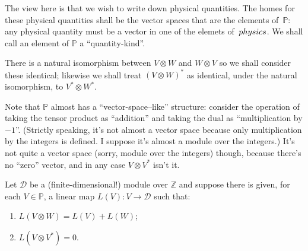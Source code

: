 \documentclass[a4paper, twocolumn, 10pt]{article}
\newcommand{\physics}{\mathbb{P}}
\newcommand{\dimensions}{\mathcal{D}}
\newcommand{\integers}{\mathbb{Z}}
\begin{document}
The view here is that we wish to write down physical quantities. The homes for
these physical quantities shall be the vector spaces that are the elements
of~$\physics$: any physical quantity must be a vector in one of the elemets
of~$\\physics$. We shall call an element of $\physics$ a ``quantity-kind''.

There is a natural isomorphism between $V\otimes W$ and $W\otimes V$ so we shall
consider these identical; likewise we shall treat $(V\otimes W)^*$ as identical,
under the natural isomorphism, to $V^*\otimes W^*$. 

Note that $\physics$ almost has a ``vector-space--like'' structure: consider the
operation of taking the tensor product as ``addition'' and taking the dual as
``multiplication by $-1$''. (Strictly speaking, it's not almost a vector space because
only multiplication by the integers is defined. I suppose it's almost a module over the
integers.) It's not quite a vector space (sorry, module over the integers)
though, because there's no ``zero'' vector, and in any case $V\otimes V^*$ isn't it.  

Let $\dimensions$ be a (finite-dimensional!) module over $\integers$ and suppose there is
given, for each $V\in\physics$, a linear map $L(V):V\to\dimensions$ such that:
\begin{enumerate}
\item $L(V\otimes W) = L(V) + L(W)$;
\item $L(V\otimes V^*) = 0$.
\end{enumerate}



  
\end{document}
